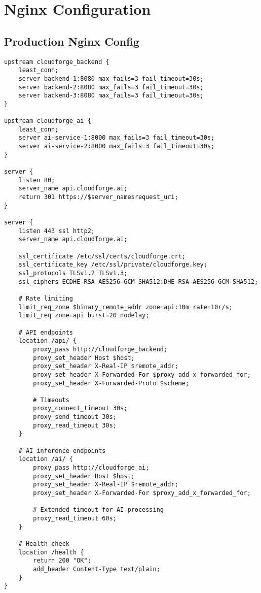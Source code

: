 \section{Nginx Configuration}

\subsection{Production Nginx Config}

\begin{lstlisting}[language=nginx]
upstream cloudforge_backend {
    least_conn;
    server backend-1:8080 max_fails=3 fail_timeout=30s;
    server backend-2:8080 max_fails=3 fail_timeout=30s;
    server backend-3:8080 max_fails=3 fail_timeout=30s;
}

upstream cloudforge_ai {
    least_conn;
    server ai-service-1:8000 max_fails=3 fail_timeout=30s;
    server ai-service-2:8000 max_fails=3 fail_timeout=30s;
}

server {
    listen 80;
    server_name api.cloudforge.ai;
    return 301 https://$server_name$request_uri;
}

server {
    listen 443 ssl http2;
    server_name api.cloudforge.ai;

    ssl_certificate /etc/ssl/certs/cloudforge.crt;
    ssl_certificate_key /etc/ssl/private/cloudforge.key;
    ssl_protocols TLSv1.2 TLSv1.3;
    ssl_ciphers ECDHE-RSA-AES256-GCM-SHA512:DHE-RSA-AES256-GCM-SHA512;

    # Rate limiting
    limit_req_zone $binary_remote_addr zone=api:10m rate=10r/s;
    limit_req zone=api burst=20 nodelay;

    # API endpoints
    location /api/ {
        proxy_pass http://cloudforge_backend;
        proxy_set_header Host $host;
        proxy_set_header X-Real-IP $remote_addr;
        proxy_set_header X-Forwarded-For $proxy_add_x_forwarded_for;
        proxy_set_header X-Forwarded-Proto $scheme;
        
        # Timeouts
        proxy_connect_timeout 30s;
        proxy_send_timeout 30s;
        proxy_read_timeout 30s;
    }

    # AI inference endpoints
    location /ai/ {
        proxy_pass http://cloudforge_ai;
        proxy_set_header Host $host;
        proxy_set_header X-Real-IP $remote_addr;
        proxy_set_header X-Forwarded-For $proxy_add_x_forwarded_for;
        
        # Extended timeout for AI processing
        proxy_read_timeout 60s;
    }

    # Health check
    location /health {
        return 200 "OK";
        add_header Content-Type text/plain;
    }
}
\end{lstlisting}

